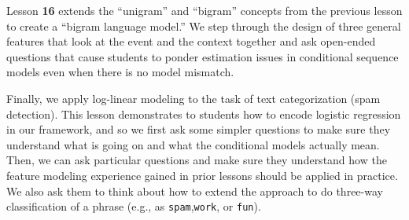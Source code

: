 \documentclass[11pt,letterpaper]{article}
\begin{document}
Lesson \textbf{16} extends the ``unigram'' and ``bigram'' concepts from the previous lesson to create a ``bigram 
language model.'' We step through the design of three general features that look at the event and the context 
together and ask open-ended questions that cause students to ponder estimation issues in conditional sequence 
models even when there is no model mismatch.


Finally, we apply log-linear modeling to the task of text categorization (spam detection). This lesson demonstrates to students how to encode logistic regression in our framework, and so 
we first ask some simpler questions to make sure they understand what is going on and what the conditional models actually mean.
Then, we can ask particular questions and make sure they understand how the feature modeling experience gained in 
prior lessons should be applied in practice. We also ask them to think about how to extend the approach to do three-way classification 
of a phrase (e.g., as \texttt{spam},\texttt{work}, or \texttt{fun}).
\end{document}

